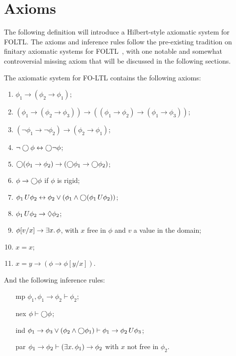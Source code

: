 \section{Axioms}
The following definition will introduce a Hilbert-style axiomatic system for \ac{FOLTL}. The axioms and inference rules
follow the pre-existing tradition on finitary axiomatic systems for
\ac{FOLTL}~\cite{burgess_axioms_1982,xu_us-tense_1988}, with one notable and somewhat controversial missing axiom that
will be discussed in the following sections.

\begin{definition}\label{def:axioms}
  The axiomatic system for FO-LTL contains the following axioms:
  \begin{enumerate}
    \item $\phi_1 \to (\phi_2 \to \phi_1)$;
    \item $(\phi_1 \to (\phi_2 \to \phi_3)) \to ((\phi_1 \to \phi_2) \to (\phi_1 \to \phi_3))$;
    \item $(\neg\phi_1 \to \neg\phi_2) \to (\phi_2 \to \phi_1)$;
    \item $\neg\bigcirc{\phi} \leftrightarrow \bigcirc{\neg\phi}$;
    \item $\bigcirc{(\phi_1 \to \phi_2)} \to (\bigcirc{\phi_1} \to \bigcirc{\phi_2})$;
    \item $\phi \to \bigcirc{\phi}$ if $\phi$ is rigid;
    \item ${\phi_1}\,U {\phi_2} \leftrightarrow \phi_2 \lor (\phi_1 \land \bigcirc{({\phi_1}\,U {\phi_2})})$;
    \item ${\phi_1}\,U {\phi_2} \to \Diamond{\phi_2}$;
    \item $\phi[v/x] \to \exists {x} \ldotp {\phi}$, with $x$ free in $\phi$ and $v$ a value in the domain;
    \item $x = x$;
    \item $x = y \to (\phi \to \phi[y/x])$.
  \end{enumerate}
  And the following inference rules:
  \begin{enumerate}
    \item[mp] $\phi_1, \phi_1 \to \phi_2 \vdash \phi_2$;
    \item[nex] $\phi \vdash \bigcirc{\phi}$;
    \item[ind] $\phi_1 \to \phi_3 \lor (\phi_2 \land \bigcirc{\phi_1}) \vdash \phi_1 \to {\phi_2}\,U {\phi_3}$;
    \item[par] $\phi_1 \to \phi_2 \vdash (\exists {x} \ldotp {\phi_1}) \to \phi_2$ with $x$ not free in $\phi_2$.
  \end{enumerate}
\end{definition}

